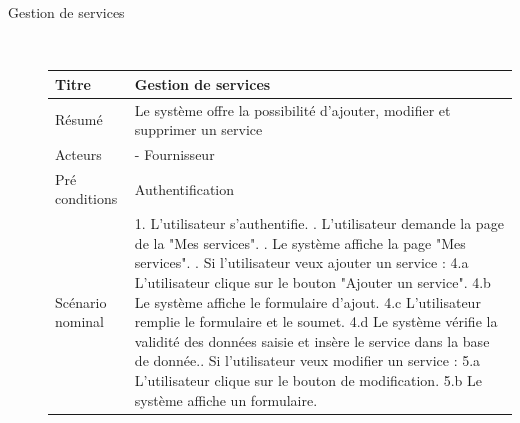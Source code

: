 \documentclass[french]{report}
\begin{document}
\begin{description}
    \newpage
        \item[Gestion de services] \hfill \newline \\
        \begin{minipage}{\linewidth}
        \centering
            \def\arraystretch{2}
            \begin{tabular}{|m{3cm}|m{9cm}|}
            \hline
            Titre                & Gestion de services                                                                                                 \\ 
            \hline
            Résumé               & Le système offre la possibilité d'ajouter, modifier et supprimer un service \\ 
            \hline
            Acteurs              & - Fournisseur                                                                                    \\ 
            \hline
            Pré conditions       & Authentification                                                                                                      \\ 
            \hline
            Scénario nominal     &  
                1. L'utilisateur s'authentifie. \newline
                2. L'utilisateur demande la page de la "Mes services". \newline
                3. Le système affiche la page "Mes services". \newline
                4. Si l'utilisateur veux ajouter un service :\newline
                    4.a L'utilisateur clique sur le bouton "Ajouter un service". \newline
                    4.b Le système affiche le formulaire d'ajout. \newline
                    4.c L'utilisateur remplie le formulaire et le soumet. \newline
                    4.d Le système vérifie la validité des données saisie et insère le service dans la base de donnée.\newline
                5. Si l'utilisateur veux modifier un service : \newline
                    5.a L'utilisateur clique sur le bouton de modification. \newline
                    5.b Le système affiche un formulaire. \newline

\end{tabular}
\end{minipage}
\end{description}
\end{document}
